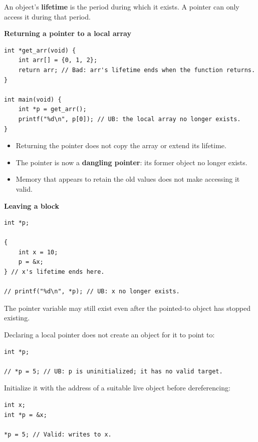\documentclass[11pt,a4paper]{article}
\begin{document}

An object's \textbf{lifetime} is the period during which it exists.
A pointer can only access it during that period.

\textbf{Returning a pointer to a local array}

\begin{lstlisting}[style=cscode]
int *get_arr(void) {
    int arr[] = {0, 1, 2};
    return arr; // Bad: arr's lifetime ends when the function returns.
}

int main(void) {
    int *p = get_arr();
    printf("%d\n", p[0]); // UB: the local array no longer exists.
}
\end{lstlisting}

\begin{itemize}
    \item Returning the pointer does not copy the array or
          extend its lifetime.
    \item The pointer is now a \textbf{dangling pointer}:
          its former object no longer exists.
    \item Memory that appears to retain the old values does not
          make accessing it valid.
\end{itemize}

\textbf{Leaving a block}

\begin{lstlisting}[style=cscode]
int *p;

{
    int x = 10;
    p = &x;
} // x's lifetime ends here.

// printf("%d\n", *p); // UB: x no longer exists.
\end{lstlisting}

The pointer variable may still exist even after the pointed-to
object has stopped existing.


Declaring a local pointer does not create an object for it to
point to:

\begin{lstlisting}[style=cscode]
int *p;

// *p = 5; // UB: p is uninitialized; it has no valid target.
\end{lstlisting}

Initialize it with the address of a suitable live object before
dereferencing:

\begin{lstlisting}[style=cscode]
int x;
int *p = &x;

*p = 5; // Valid: writes to x.
\end{lstlisting}
\end{document}
